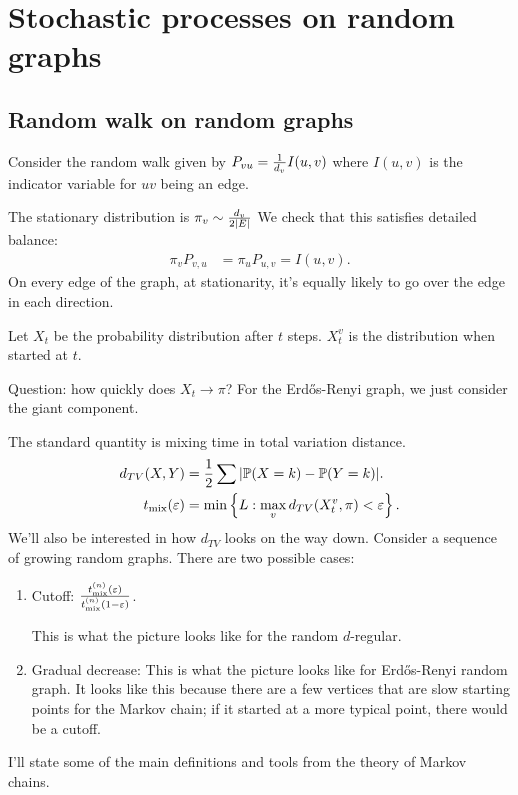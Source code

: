 \chapter{Stochastic processes on random graphs}

\section{Random walk on random graphs}

Consider the random walk given by $P_{vu} = \frac{1}{d_v} I(u,v)$ where $I(u,v)$ is the indicator variable for $uv$ being an edge.

The stationary distribution is $\pi_v \sim \frac{d_v}{2|E|}$ We check that this satisfies detailed balance:
\begin{align}
\pi_vP_{v,u} &= \pi_u P_{u,v}
=I(u,v).
\end{align}
On every edge of the graph, at stationarity, it's equally likely to go over the edge in each direction.

Let $X_t$ be the probability distribution after $t$ steps. $X_t^v$ is the distribution when started at $t$.

Question: how quickly does $X_t\to \pi$?
For the Erd\H os-Renyi graph, we just consider the giant component.

The standard quantity is mixing time in total variation distance.
\begin{align}
d_{TV}(X,Y) &= \frac{1}{2} \sum |\mathbb{P}(X=k) - \mathbb{P}(Y=k)|.\\
t_{\text{mix}}(\varepsilon)&= \min\left\{{L}:{\max_v d_{TV}(X_t^v, \pi)<\varepsilon}\right\}.
\end{align}
We'll also be interested in how $d_{TV}$ looks on the way down. Consider a sequence of growing random graphs.
There are two possible cases:
\begin{enumerate}
\item
Cutoff: $\frac{t_{\text{mix}}^{(n)}(\varepsilon)}{t_{\text{mix}}^{(n)}(1-\varepsilon)}$.

This is what the picture looks like for the random $d$-regular.
\item
Gradual decrease: This is what the picture looks like for Erd\H os-Renyi random graph. It looks like this because there are a few vertices that are slow starting points for the Markov chain; if it started at a more typical point, there would be a cutoff.
\end{enumerate}

I'll state some of the main definitions and tools from the theory of Markov chains.

